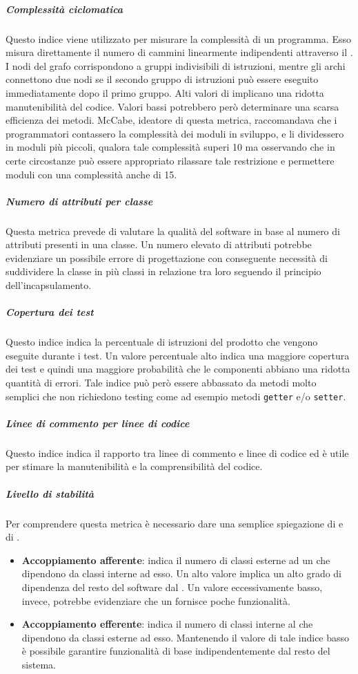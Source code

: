 \subparagraph{Complessità ciclomatica}
Questo indice viene utilizzato per misurare la complessità di un programma. Esso misura direttamente il numero di cammini linearmente indipendenti attraverso il . I nodi del grafo corrispondono a gruppi indivisibili di istruzioni, mentre gli archi connettono due nodi se il secondo gruppo di istruzioni può essere eseguito immediatamente dopo il primo gruppo.
Alti valori di  implicano una ridotta manutenibilità del codice. Valori bassi potrebbero però determinare  una scarsa efficienza dei metodi. McCabe, ideatore di questa metrica, raccomandava che i programmatori contassero la complessità dei moduli in sviluppo, e li dividessero in moduli più piccoli, qualora tale complessità superi 10 ma osservando che in certe circostanze può essere appropriato rilassare tale restrizione e permettere moduli con una complessità anche di 15.

\subparagraph{Numero di attributi per classe}
Questa metrica prevede di valutare la qualità del software in base al numero di attributi presenti in una classe.
Un numero elevato di attributi potrebbe evidenziare un possibile errore di progettazione con conseguente necessità di suddividere la classe in più classi in relazione tra loro seguendo il principio dell'incapsulamento.

\subparagraph{Copertura dei test}
Questo indice indica la percentuale di istruzioni del prodotto che vengono eseguite durante i test.
Un valore percentuale alto indica una maggiore copertura dei test e quindi una maggiore probabilità che le componenti abbiano una ridotta quantità di errori.
Tale indice può però essere abbassato da metodi molto semplici che non richiedono testing come ad esempio metodi \texttt{getter} e/o \texttt{setter}.

\subparagraph{Linee di commento per linee di codice}
Questo indice indica il rapporto tra linee di commento e linee di codice ed è utile per stimare la manutenibilità e la comprensibilità del codice. 

\subparagraph{Livello di stabilità}
Per comprendere questa metrica è necessario dare una semplice spiegazione di  e di .
\begin{itemize}
\item
\textbf{Accoppiamento afferente}: indica il numero di classi esterne ad un  che dipendono da classi interne ad esso.
Un alto valore implica un alto grado di dipendenza del resto del software dal . Un valore eccessivamente basso, invece, potrebbe evidenziare che un  fornisce poche funzionalità.
\item
\textbf{Accoppiamento efferente}: indica il numero di classi interne al  che dipendono da classi esterne ad esso.
Mantenendo il valore di tale indice basso è possibile garantire funzionalità di base indipendentemente dal resto del sistema.
\end{itemize}

